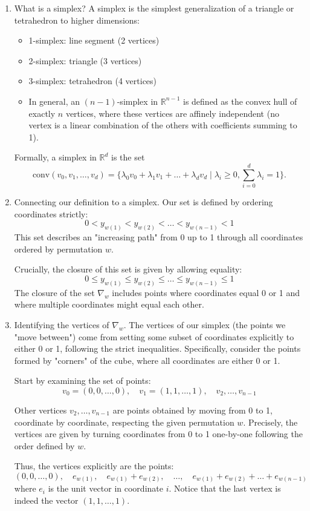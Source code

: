 \documentclass[12pt]{article}
\theoremstyle{definition}
\numberwithin{equation}{subsection}
\begin{document}
\begin{enumerate}
    \item What is a simplex? A simplex is the simplest generalization of a triangle or tetrahedron to higher dimensions:
    \begin{itemize}
        \item 1-simplex: line segment (2 vertices)
        \item 2-simplex: triangle (3 vertices)
        \item 3-simplex: tetrahedron (4 vertices)
        \item In general, an $(n-1)$-simplex in $\mathbb{R}^{n-1}$ is defined as the convex hull of exactly $n$ vertices, where these vertices are affinely independent (no vertex is a linear combination of the others with coefficients summing to 1).
    \end{itemize}
Formally, a simplex in $\mathbb{R}^{d}$ is the set
$$
\text{conv}(v_0, v_1, \dots, v_d) = \{ \lambda_0 v_0 + \lambda_1 v_1 + \dots + \lambda_d v_d \mid \lambda_i \ge 0, \sum_{i=0}^d \lambda_i = 1 \}.
$$
    \item Connecting our definition to a simplex. Our set is defined by ordering coordinates strictly:
$$
0 < y_{w(1)} < y_{w(2)} < \dots < y_{w(n-1)} < 1
$$
This set describes an "increasing path" from 0 up to 1 through all coordinates ordered by permutation $w$.

Crucially, the closure of this set is given by allowing equality:
$$
0 \leq y_{w(1)} \leq y_{w(2)} \leq \dots \leq y_{w(n-1)} \leq 1
$$
The closure of the set $\nabla_w$ includes points where coordinates equal 0 or 1 and where multiple coordinates might equal each other.
    \item Identifying the vertices of $\nabla_w$. The vertices of our simplex (the points we "move between") come from setting some subset of coordinates explicitly to either 0 or 1, following the strict inequalities. Specifically, consider the points formed by "corners" of the cube, where all coordinates are either 0 or 1.

Start by examining the set of points:
  $$
  v_0=(0,0,\dots,0), \quad v_1=(1,1,\dots,1), \quad v_2,\dots,v_{n-1}
  $$

Other vertices $v_2,\dots,v_{n-1}$ are points obtained by moving from 0 to 1, coordinate by coordinate, respecting the given permutation $w$. Precisely, the vertices are given by turning coordinates from 0 to 1 one-by-one following the order defined by $w$.

Thus, the vertices explicitly are the points:
$$
(0,0,\dots,0),\quad e_{w(1)},\quad e_{w(1)}+e_{w(2)},\quad \dots,\quad e_{w(1)}+e_{w(2)}+\dots+e_{w(n-1)}
$$
where $e_i$ is the unit vector in coordinate $i$. Notice that the last vertex is indeed the vector $(1,1,\dots,1)$.


\end{enumerate}
\end{document}
